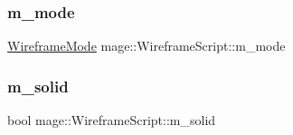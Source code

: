 \subsubsection{\texorpdfstring{m\+\_\+mode}{m\_mode}}
{\footnotesize\ttfamily \hyperlink{classmage_1_1_wireframe_script_a99d65e77e89c2581544e68030adcefb7}{Wireframe\+Mode} mage\+::\+Wireframe\+Script\+::m\+\_\+mode\hspace{0.3cm}{\ttfamily [private]}}

\hypertarget{classmage_1_1_wireframe_script_a5e038a5e1615ab9323132a3e0a228a82}{}\label{classmage_1_1_wireframe_script_a5e038a5e1615ab9323132a3e0a228a82} 
\subsubsection{\texorpdfstring{m\+\_\+solid}{m\_solid}}
{\footnotesize\ttfamily bool mage\+::\+Wireframe\+Script\+::m\+\_\+solid\hspace{0.3cm}{\ttfamily [private]}}

